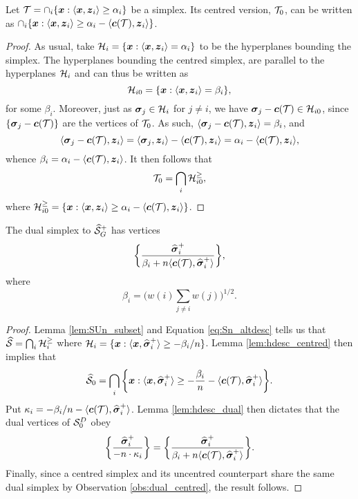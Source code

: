 \begin{lemma}
	\label{lem:hdesc_centred}
	Let $\mathcal{T}=\cap_i \{\vb*{x}:\langle \vb*{x},\vb*{z}_i\rangle \geq \alpha_i\}$ be a simplex. Its centred version, $\mathcal{T}_0$, can be written as $\cap_i \{\vb*{x}:\langle \vb*{x},\vb*{z}_i\rangle \geq \alpha_i - \langle \vb*{c}(\mathcal{T}),\vb*{z}_i\rangle\}$. 
\end{lemma}
\begin{proof}
	As usual, take $\mathcal{H}_i = \{\vb*{x}:\langle \vb*{x},\vb*{z}_i\rangle = \alpha_i\}$ to be the hyperplanes bounding the simplex. The hyperplanes bounding the centred simplex, are parallel to the hyperplanes $\mathcal{H}_i$ and can thus be written as 
	\[\mathcal{H}_{i0} = \{\vb*{x}:\langle \vb*{x},\vb*{z}_i\rangle = \beta_i\},\]
	for some $\beta_i$. Moreover, just as $\vb*{\sigma}_j\in\mathcal{H}_i$ for $j\neq i$, we have $\vb*{\sigma}_j-\vb*{c}(\mathcal{T})\in \mathcal{H}_{i0}$, since $\{\vb*{\sigma}_j-\vb*{c}(\mathcal{T})\}$ are the vertices of $\mathcal{T}_0$. As such, $\langle \vb*{\sigma}_j-\vb*{c}(\mathcal{T}),\vb*{z}_i\rangle=\beta_i$, and 
	\[\langle \vb*{\sigma}_j-\vb*{c}(\mathcal{T}),\vb*{z}_i\rangle = \langle \vb*{\sigma}_j,\vb*{z}_i\rangle - \langle\vb*{c}(\mathcal{T}),\vb*{z}_i\rangle = \alpha_i - \langle\vb*{c}(\mathcal{T}),\vb*{z}_i\rangle,\]
	whence $\beta_i = \alpha_i - \langle\vb*{c}(\mathcal{T}),\vb*{z}_i\rangle$. It then follows that 
	\[\mathcal{T}_0=\bigcap_i \mathcal{H}_{i0}^{\geq },\]
	where $\mathcal{H}_{i0}^\geq = \{\vb*{x}:\langle \vb*{x},\vb*{z}_i\rangle \geq  \alpha_i - \langle \vb*{c}(\mathcal{T}),
	\vb*{z}_i\rangle\}$. 
\end{proof}

\begin{corollary}
	\label{cor:dual_Sn}
	The dual simplex to $\widehat{\mathcal{S}}_G^+$ has vertices 
	\begin{equation*}
	\bigg\{\frac{\widehat{\vb*{\sigma}}_i^+}{\beta_i + n\langle \vb*{c}(\mathcal{T}),\widehat{\vb*{\sigma}}_i^+\rangle}\bigg\},
	\end{equation*}
	where 
	\[\beta_i = \bigg(w(i)\sum_{j\neq i}w(j)\bigg)^{1/2}.\]
\end{corollary}
\begin{proof}
	Lemma \ref{lem:SUn_subset} and Equation \eqref{eq:Sn_altdesc} tells us that $\widehat{\mathcal{S}} = \bigcap_i \mathcal{H}_i^\geq $ where  $\mathcal{H}_i = \{\vb*{x}:\langle \vb*{x},\widehat{\vb*{\sigma}}^+_i\rangle \geq -\beta_i/n\}$. Lemma \ref{lem:hdesc_centred} then implies that 
	\begin{equation*}
	\widehat{\mathcal{S}}_0 = \bigcap_i \bigg\{\vb*{x}:\langle \vb*{x},\widehat{\vb*{\sigma}}_i^+\rangle \geq -\frac{\beta_i}{n} - \langle \vb*{c}(\mathcal{T}),\widehat{\vb*{\sigma}}_i^+\rangle\bigg\}.
	\end{equation*}
	Put $\kappa_i = -\beta_i/n - \langle \vb*{c}(\mathcal{T}),\widehat{\vb*{\sigma}}_i^+\rangle$. 
	Lemma \ref{lem:hdesc_dual} then dictates that the dual vertices of $\mathcal{S}_0^D$ obey 
	\begin{equation*}
	\bigg\{\frac{\widehat{\vb*{\sigma}}_i^+}{-n\cdot \kappa_i}\bigg\} = 	\bigg\{\frac{\widehat{\vb*{\sigma}}_i^+}{\beta_i + n\langle \vb*{c}(\mathcal{T}),\widehat{\vb*{\sigma}}_i^+\rangle}\bigg\}.
	\end{equation*}
	Finally, since a centred simplex and its uncentred counterpart share the same dual simplex by Observation \ref{obs:dual_centred}, the result follows. 
\end{proof}










